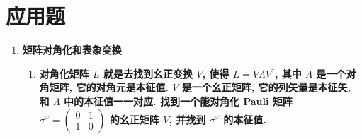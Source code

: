 \documentclass[../../main.tex]{subfiles}
\begin{document}
\section{应用题}
\begin{enumerate}
  \item \textbf{矩阵对角化和表象变换}
  \begin{enumerate}
    \item \textbf{对角化矩阵 $L$ 就是去找到幺正变换 $V$, 使得 $L = V\Lambda V^{\dagger}$, 其中 $\Lambda$ 是一个对角矩阵, 它的对角元是本征值. $V$ 是一个幺正矩阵, 它的列矢量是本征矢, 和 $\Lambda$ 中的本征值一一对应. 找到一个能对角化 Pauli 矩阵 $\sigma^{x} = \begin{pmatrix}
      0 & 1\\
      1 & 0
    \end{pmatrix}$ 的幺正矩阵 $V$, 并找到 $\sigma^{x}$ 的本征值. }


\end{enumerate}
\end{enumerate}
\end{document}
